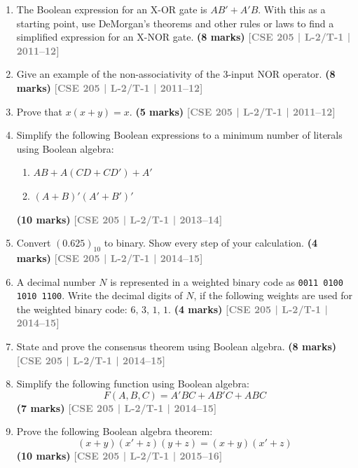\documentclass[12pt,a4paper]{article}
\newcommand{\yr}[1]{\hfill\textcolor{gray}{\small\textbf{[#1]}}}
\newcommand{\mk}[1]{\textcolor{orange!70!black}{\small\textbf{(#1 marks)}}}
\begin{document}
\begin{enumerate}

\item The Boolean expression for an X-OR gate is $AB' + A'B$. With this as a starting point, use DeMorgan's theorems and other rules or laws to find a simplified expression for an X-NOR gate.
\mk{8} \yr{CSE 205 | L-2/T-1 | 2011--12}

\item Give an example of the non-associativity of the 3-input NOR operator.
\mk{8} \yr{CSE 205 | L-2/T-1 | 2011--12}

\item Prove that $x(x + y) = x$.
\mk{5} \yr{CSE 205 | L-2/T-1 | 2011--12}

\item Simplify the following Boolean expressions to a minimum number of literals using Boolean algebra:
\begin{enumerate}
  \item $AB + A(CD + CD') + A'$
  \item $(A + B)'(A' + B')'$

  \end{enumerate}
\mk{10} \yr{CSE 205 | L-2/T-1 | 2013--14}
\item Convert $(0.625)_{10}$ to binary. Show every step of your calculation.
\mk{4} \yr{CSE 205 | L-2/T-1 | 2014--15}

\item A decimal number $N$ is represented in a weighted binary code as \texttt{0011 0100 1010 1100}. Write the decimal digits of $N$, if the following weights are used for the weighted binary code: $6,\,3,\,1,\,1$.
\mk{4} \yr{CSE 205 | L-2/T-1 | 2014--15}


\item State and prove the consensus theorem using Boolean algebra.
\mk{8} \yr{CSE 205 | L-2/T-1 | 2014--15}

\item Simplify the following function using Boolean algebra:
\[ F(A, B, C) = A'BC + AB'C + ABC \]
\mk{7} \yr{CSE 205 | L-2/T-1 | 2014--15}


\item Prove the following Boolean algebra theorem:
\[ (x + y)(x' + z)(y + z) = (x + y)(x' + z) \]
\mk{10} \yr{CSE 205 | L-2/T-1 | 2015--16}


\end{enumerate}
\end{document}
